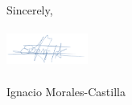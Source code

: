 \documentclass[11pt,a4paper]{letter}
\begin{document}
\begin{letter}{}
\vspace{0.25ex}\\
\vspace{1.5ex}\\


\vspace{1.5ex}\\
\noindent Sincerely,\\
\vspace{1.5ex}\\
 \includegraphics[width=0.2\textwidth]{Signature_IMC.png} \\
 \vspace{1.5ex}\\
\noindent Ignacio Morales-Castilla


\end{letter}
\end{document}

